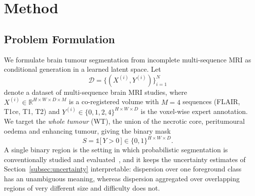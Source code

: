 %
%

\section{Method}
\label{sec:method}

\subsection{Problem Formulation}
\label{subsec:problem}

We formulate brain tumour segmentation from incomplete multi-sequence MRI as
conditional generation in a learned latent space. Let
\begin{equation}
    \mathcal{D} = \bigl\{ (X^{(i)}, Y^{(i)}) \bigr\}_{i=1}^{N}
\end{equation}
denote a dataset of multi-sequence brain MRI studies, where
$X^{(i)} \in \mathbb{R}^{H \times W \times D \times M}$ is a co-registered
volume with $M = 4$ sequences (FLAIR, T1ce, T1, T2) and
$Y^{(i)} \in \{0,1,2,4\}^{H \times W \times D}$ is the voxel-wise expert
annotation. We target the \emph{whole tumour} (WT), the union of the necrotic
core, peritumoural oedema and enhancing tumour, giving the binary mask
\begin{equation}
    S = \mathbb{1}\bigl[\, Y > 0 \,\bigr] \in \{0,1\}^{H \times W \times D}.
    \label{eq:wt}
\end{equation}
A single binary region is the setting in which probabilistic segmentation is
conventionally studied and evaluated~\cite{probunet,phiseg},
and it keeps the uncertainty estimates of Section~\ref{subsec:uncertainty}
interpretable: dispersion over one foreground class has an unambiguous
meaning, whereas dispersion aggregated over overlapping regions of very
different size and difficulty does not.

